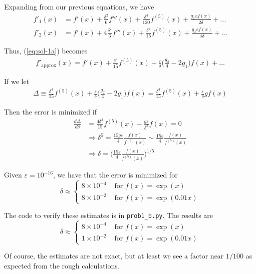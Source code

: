 \documentclass{article}
\begin{document}
\begin{itemize}
    Expanding from our previous equations, we have
    \begin{align*}
        f'_1(x) &= f'(x) + \frac{\delta^2}{6} f'''(x) + \frac{\delta^4}{120} f^{(5)}(x) + \frac{g_1 \varepsilon f(x) }{2 \delta} + ...\\
        f'_2 (x) &= f'(x) + 4 \frac{\delta^2}{6} f'''(x) + \frac{\delta^4}{15} f^{(5)}(x) + \frac{g_2 \varepsilon f(x) }{4 \delta} + ...
    \end{align*}
    
    Thus, (\ref{eq:sol-1a}) becomes
    \begin{align}
        f'_{\text{approx}}(x) = f'(x) + \frac{\delta^4}{15}f^{(5)}(x) + \frac{\varepsilon}{\delta} \Big( \frac{g_2}{4} - 2 g_1 \Big) f(x) + ...
    \end{align}
    
    If we let
    \begin{align*}
        \Delta \equiv \frac{\delta^4}{15}f^{(5)}(x) + \frac{\varepsilon}{\delta} \Big( \frac{g_2}{4} - 2 g_1 \Big) f(x) = \frac{\delta^4}{15}f^{(5)}(x) + \frac{\varepsilon}{\delta} g f(x)
    \end{align*}
    
    Then the error is minimized if
    \begin{align*}
        \frac{d\Delta}{d\delta} &= \frac{4 \delta^3}{15}f^{(5)}(x) - \frac{g \varepsilon}{\delta^2} f(x) = 0\\
        &\Rightarrow \delta^5 = \frac{15 g \varepsilon}{4} \frac{f(x)}{f^{(5)}(x)} \sim \frac{15 \varepsilon}{4} \frac{f(x)}{f^{(5)}(x)}\\
        &\Rightarrow \delta = \Big( \frac{15 \varepsilon}{4} \frac{f(x)}{f^{(5)}(x)} \Big)^{1/5}
    \end{align*}
    
    Given $\varepsilon = 10^{-16}$, we have that the error is minimized for
    \begin{equation*}
        \delta \approx 
        \begin{cases}
        8 \times 10^{-4} & \text{ for } f(x) = \exp(x)\\
        8 \times 10^{-2} & \text{ for } f(x) = \exp(0.01x)
        \end{cases}
    \end{equation*}
    
    The code to verify these estimates is in \verb|prob1_b.py|. The results are 
    \begin{equation*}
        \delta \approx 
        \begin{cases}
        8 \times 10^{-4} & \text{ for } f(x) = \exp(x)\\
        1 \times 10^{-2} & \text{ for } f(x) = \exp(0.01x)
        \end{cases}
    \end{equation*}
    
    Of course, the estimates are not exact, but at least we see a factor near $1/100$ as expected from the rough calculations.
\end{itemize}
\end{document}
